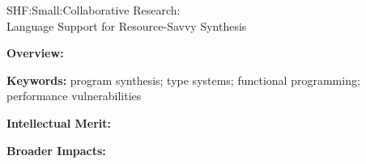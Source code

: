 \documentclass[12pt]{article}
\begin{document}
\setcounter{page}{1}

 \begin{large}
\begin{center}
SHF:Small:Collaborative Research: \\
Language Support for Resource-Savvy Synthesis
\end{center}
\end{large}

\noindent
\textbf{Overview:} 

\noindent\textbf{Keywords:} program synthesis; type systems;
functional programming; performance vulnerabilities

\noindent
\textbf{Intellectual Merit:} 



\noindent
\textbf{Broader Impacts:} 
\end{document}
